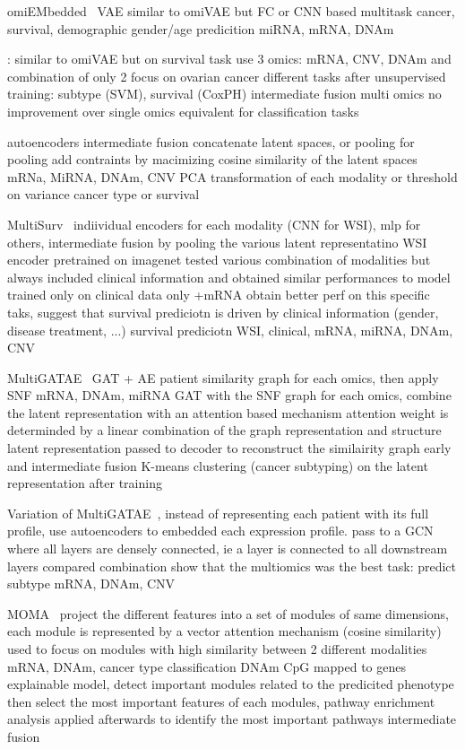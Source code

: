 \documentclass[../main.tex]{subfiles}
\begin{document}
		omiEMbedded~\cite{Zhang2021} VAE similar to omiVAE but FC or CNN based
		multitask cancer, survival, demographic gender/age predicition
		miRNA, mRNA, DNAm

		\cite{Hira2021}: similar to omiVAE but on survival task
		use 3 omics: mRNA, CNV, DNAm and combination of only 2
		focus on ovarian cancer
		different tasks after unsupervised training: subtype (SVM), survival (CoxPH)
		intermediate fusion
		multi omics no improvement over single omics equivalent for classification tasks

		

		\cite{Tong2021} autoencoders intermediate fusion
		concatenate latent spaces, or pooling
		for pooling add contraints by macimizing cosine similarity of the latent spaces
		mRNa, MiRNA, DNAm, CNV
		PCA transformation of each modality or threshold on variance
		cancer type or survival

		MultiSurv~\cite{MultiSurv} indiividual encoders for each modality (CNN for WSI), mlp for others,
		intermediate fusion by pooling the various latent representatino
		WSI encoder pretrained on imagenet
		tested various combination of modalities but always  included clinical information and obtained similar performances to model trained only on clinical data only +mRNA obtain better perf on this specific taks, suggest that survival prediciotn is driven by clinical information (gender, disease treatment, ...)
		survival prediciotn
		WSI, clinical, mRNA, miRNA, DNAm, CNV

		MultiGATAE~\cite{MultiGATAE} GAT + AE
		patient similarity graph for each omics, then apply SNF
		mRNA, DNAm, miRNA
		GAT with the SNF graph for each omics, combine the latent representation with an attention based mechanism
		attention weight is determinded by a linear combination of the graph representation and structure
		latent representation passed to decoder to reconstruct the similairity graph
		early and intermediate fusion
		K-means clustering (cancer subtyping) on the latent representation after training

		Variation of MultiGATAE~\cite{Zhang2022}, instead of representing each patient with its full profile, use autoencoders to embedded each expression profile.
		pass to a GCN where all layers are densely connected, ie a layer is connected to all downstream layers
		compared combination show that the multiomics was the best
		task: predict subtype
		mRNA, DNAm, CNV

		MOMA~\cite{MOMA}
		project the different features into a set of modules of same dimensions, each module is represented by a vector
		attention mechanism (cosine similarity) used to focus on modules with high similarity between 2 different modalities
		mRNA, DNAm, cancer type classification
		DNAm CpG mapped to genes
		explainable model, detect important modules related to the predicited phenotype then select the most important features of each modules, pathway enrichment analysis applied afterwards to identify the most important pathways
		intermediate fusion
\end{document}
